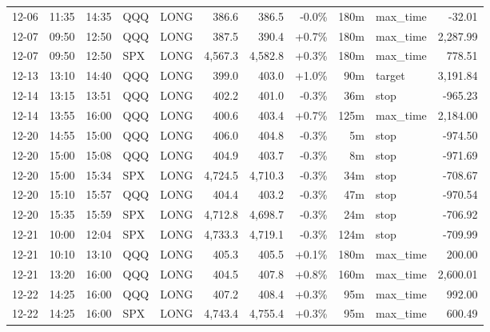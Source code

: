 \documentclass[11pt,a4paper,twoside]{article}
\begin{document}
\begin{center}
\begin{longtable}{>{\color{txtmain}}l l l l l r r r r >{\color{txtmain}}l r}
12-06 & 11:35 & 14:35 & QQQ & LONG & 386.6 & 386.5 & \textcolor{lossred}{-0.0\%} & 180m & max\_time & \textcolor{lossred}{-32.01} \\
12-07 & 09:50 & 12:50 & QQQ & LONG & 387.5 & 390.4 & \textcolor{wingreen}{+0.7\%} & 180m & max\_time & \textcolor{wingreen}{2,287.99} \\
12-07 & 09:50 & 12:50 & SPX & LONG & 4,567.3 & 4,582.8 & \textcolor{wingreen}{+0.3\%} & 180m & max\_time & \textcolor{wingreen}{778.51} \\
12-13 & 13:10 & 14:40 & QQQ & LONG & 399.0 & 403.0 & \textcolor{wingreen}{+1.0\%} & 90m & target & \textcolor{wingreen}{3,191.84} \\
12-14 & 13:15 & 13:51 & QQQ & LONG & 402.2 & 401.0 & \textcolor{lossred}{-0.3\%} & 36m & stop & \textcolor{lossred}{-965.23} \\
12-14 & 13:55 & 16:00 & QQQ & LONG & 400.6 & 403.4 & \textcolor{wingreen}{+0.7\%} & 125m & max\_time & \textcolor{wingreen}{2,184.00} \\
12-20 & 14:55 & 15:00 & QQQ & LONG & 406.0 & 404.8 & \textcolor{lossred}{-0.3\%} & 5m & stop & \textcolor{lossred}{-974.50} \\
12-20 & 15:00 & 15:08 & QQQ & LONG & 404.9 & 403.7 & \textcolor{lossred}{-0.3\%} & 8m & stop & \textcolor{lossred}{-971.69} \\
12-20 & 15:00 & 15:34 & SPX & LONG & 4,724.5 & 4,710.3 & \textcolor{lossred}{-0.3\%} & 34m & stop & \textcolor{lossred}{-708.67} \\
12-20 & 15:10 & 15:57 & QQQ & LONG & 404.4 & 403.2 & \textcolor{lossred}{-0.3\%} & 47m & stop & \textcolor{lossred}{-970.54} \\
12-20 & 15:35 & 15:59 & SPX & LONG & 4,712.8 & 4,698.7 & \textcolor{lossred}{-0.3\%} & 24m & stop & \textcolor{lossred}{-706.92} \\
12-21 & 10:00 & 12:04 & SPX & LONG & 4,733.3 & 4,719.1 & \textcolor{lossred}{-0.3\%} & 124m & stop & \textcolor{lossred}{-709.99} \\
12-21 & 10:10 & 13:10 & QQQ & LONG & 405.3 & 405.5 & \textcolor{wingreen}{+0.1\%} & 180m & max\_time & \textcolor{wingreen}{200.00} \\
12-21 & 13:20 & 16:00 & QQQ & LONG & 404.5 & 407.8 & \textcolor{wingreen}{+0.8\%} & 160m & max\_time & \textcolor{wingreen}{2,600.01} \\
12-22 & 14:25 & 16:00 & QQQ & LONG & 407.2 & 408.4 & \textcolor{wingreen}{+0.3\%} & 95m & max\_time & \textcolor{wingreen}{992.00} \\
12-22 & 14:25 & 16:00 & SPX & LONG & 4,743.4 & 4,755.4 & \textcolor{wingreen}{+0.3\%} & 95m & max\_time & \textcolor{wingreen}{600.49} \\

\end{longtable}
\end{center}
\end{document}
